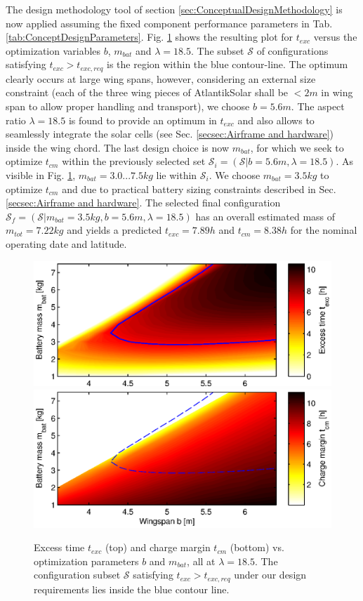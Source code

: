 The design methodology tool of section \ref{sec:ConceptualDesignMethodology} is now applied assuming the fixed component performance parameters in Tab. \ref{tab:ConceptDesignParameters}. Fig. \ref{fig:ExcessTimeChargeMargin} shows the resulting plot for $t_{exc}$ versus the optimization variables $b$, $m_{bat}$ and $\lambda=18.5$. The subset $\mathcal{S}$ of configurations satisfying $t_{exc}>t_{exc,req}$ is the region within the blue contour-line. The optimum clearly occurs at large wing spans, however, considering an external size constraint (each of the three wing pieces of AtlantikSolar shall be $<2m$ in wing span to allow proper handling and transport), we choose $b=5.6m$.  The aspect ratio $\lambda=18.5$ is found to provide an optimum in $t_{exc}$ and also allows to seamlessly integrate the solar cells (see Sec. \ref{secsec:Airframe and hardware}) inside the wing chord. The last design choice is now $m_{bat}$, for which we seek to optimize $t_{cm}$ within the previously selected set $\mathcal{S}_i=(\mathcal{S}|b=5.6m, \lambda=18.5)$. As visible in Fig. \ref{fig:ExcessTimeChargeMargin}, $m_{bat}=3.0...7.5kg$ lie within $\mathcal{S}_i$. We choose $m_{bat}=3.5kg$ to optimize $t_{cm}$ and due to practical battery sizing constraints described in Sec. \ref{secsec:Airframe and hardware}. The selected final configuration $\mathcal{S}_f=(\mathcal{S}|m_{bat}=3.5kg, b=5.6m, \lambda=18.5)$ has an overall estimated mass of $m_{tot}=7.22kg$ and yields a predicted $t_{exc}=7.89h$ and $t_{cm}=8.38h$ for the nominal operating date and latitude.
\begin{figure}[tb]
    \centering
    \includegraphics[width=\linewidth]{images/3_excesstime}
    \includegraphics[width=\linewidth]{images/4_chargemargin}
    \caption{Excess time $t_{exc}$ (top) and charge margin $t_{cm}$ (bottom) vs. optimization parameters $b$ and $m_{bat}$, all at $\lambda=18.5$. The configuration subset $\mathcal{S}$ satisfying $t_{exc}>t_{exc,req}$ under our design requirements lies inside the blue contour line.}
    \label{fig:ExcessTimeChargeMargin}
\end{figure}
